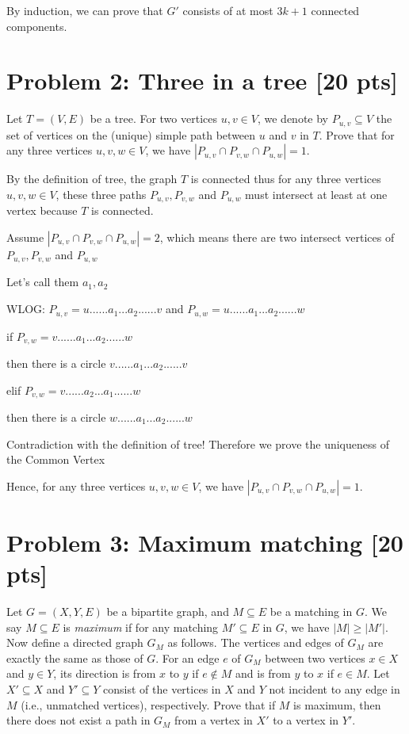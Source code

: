 \documentclass[11pt,twoside]{article}
\newcommand{\problem}[1]{\section*{Problem #1}}
\begin{document}
By induction, we can prove that $G'$ consists of at most $3k+1$ connected components.



\problem{2: Three in a tree [20 pts]}

Let $T = (V,E)$ be a tree.
For two vertices $u,v \in V$, we denote by $P_{u,v} \subseteq V$ the set of vertices on the (unique) simple path between $u$ and $v$ in $T$.
Prove that for any three vertices $u,v,w \in V$, we have $|P_{u,v} \cap P_{v,w} \cap P_{u,w}| = 1$.


\hspace*{\fill}

By the definition of tree, the graph $T$ is connected thus for any three vertices $u,v,w \in V$, these three paths $P_{u,v}, P_{v,w}$ and $ P_{u,w}$ must intersect at least at one vertex because $T$ is connected.

Assume $|P_{u,v} \cap P_{v,w} \cap P_{u,w}| =2$, which means there are two intersect vertices of $P_{u,v}, P_{v,w}$ and $ P_{u,w}$

Let's call them $a_1, a_2$



WLOG: $P_{u,v} = u......a_1...a_2......v$ 
and $P_{u,w} = u......a_1...a_2......w$

if $P_{v,w} = v......a_1...a_2......w$

then there is a circle $v......a_1...a_2......v$

elif $P_{v,w} = v......a_2...a_1......w$

then there is a circle $w......a_1...a_2......w$

Contradiction with the definition of tree! Therefore we prove the uniqueness of the Common Vertex

Hence, for any three vertices $u,v,w \in V$, we have $|P_{u,v} \cap P_{v,w} \cap P_{u,w}| = 1$.



\problem{3: Maximum matching [20 pts]}
Let $G = (X,Y,E)$ be a bipartite graph, and $M \subseteq E$ be a matching in $G$.
We say $M \subseteq E$ is \textit{maximum} if for any matching $M' \subseteq E$ in $G$, we have $|M| \geq |M'|$.
Now define a directed graph $G_M$ as follows.
The vertices and edges of $G_M$ are exactly the same as those of $G$.
For an edge $e$ of $G_M$ between two vertices $x \in X$ and $y \in Y$, its direction is from $x$ to $y$ if $e \notin M$ and is from $y$ to $x$ if $e \in M$.
Let $X' \subseteq X$ and $Y' \subseteq Y$ consist of the vertices in $X$ and $Y$ not incident to any edge in $M$ (i.e., unmatched vertices), respectively.
Prove that if $M$ is maximum, then there does not exist a path in $G_M$ from a vertex in $X'$ to a vertex in $Y'$.
\end{document}
